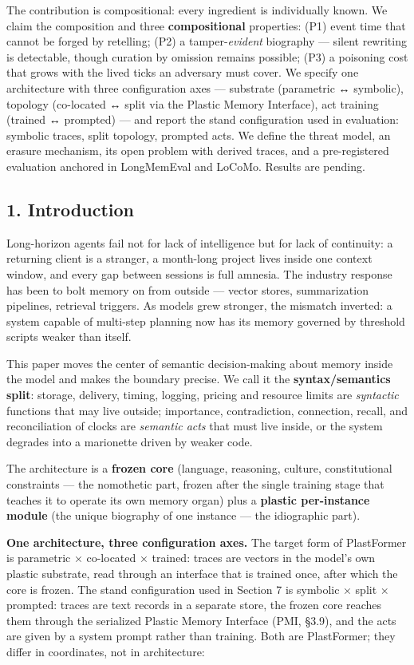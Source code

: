 \documentclass[
]{article}
\begin{document}
The contribution is compositional: every ingredient is individually
known. We claim the composition and three \textbf{compositional}
properties: (P1) event time that cannot be forged by retelling; (P2) a
tamper-\emph{evident} biography --- silent rewriting is detectable,
though curation by omission remains possible; (P3) a poisoning cost that
grows with the lived ticks an adversary must cover. We specify one
architecture with three configuration axes --- substrate (parametric ↔
symbolic), topology (co-located ↔ split via the Plastic Memory
Interface), act training (trained ↔ prompted) --- and report the stand
configuration used in evaluation: symbolic traces, split topology,
prompted acts. We define the threat model, an erasure mechanism, its
open problem with derived traces, and a pre-registered evaluation
anchored in LongMemEval and LoCoMo. Results are pending.

\subsection{1. Introduction}\label{introduction}

Long-horizon agents fail not for lack of intelligence but for lack of
continuity: a returning client is a stranger, a month-long project lives
inside one context window, and every gap between sessions is full
amnesia. The industry response has been to bolt memory on from outside
--- vector stores, summarization pipelines, retrieval triggers. As
models grew stronger, the mismatch inverted: a system capable of
multi-step planning now has its memory governed by threshold scripts
weaker than itself.

This paper moves the center of semantic decision-making about memory
inside the model and makes the boundary precise. We call it the
\textbf{syntax/semantics split}: storage, delivery, timing, logging,
pricing and resource limits are \emph{syntactic} functions that may live
outside; importance, contradiction, connection, recall, and
reconciliation of clocks are \emph{semantic acts} that must live inside,
or the system degrades into a marionette driven by weaker code.

The architecture is a \textbf{frozen core} (language, reasoning,
culture, constitutional constraints --- the nomothetic part, frozen
after the single training stage that teaches it to operate its own
memory organ) plus a \textbf{plastic per-instance module} (the unique
biography of one instance --- the idiographic part).

\textbf{One architecture, three configuration axes.} The target form of
PlastFormer is parametric × co-located × trained: traces are vectors in
the model's own plastic substrate, read through an interface that is
trained once, after which the core is frozen. The stand configuration
used in Section 7 is symbolic × split × prompted: traces are text
records in a separate store, the frozen core reaches them through the
serialized Plastic Memory Interface (PMI, §3.9), and the acts are given
by a system prompt rather than training. Both are PlastFormer; they
differ in coordinates, not in architecture:
\end{document}
